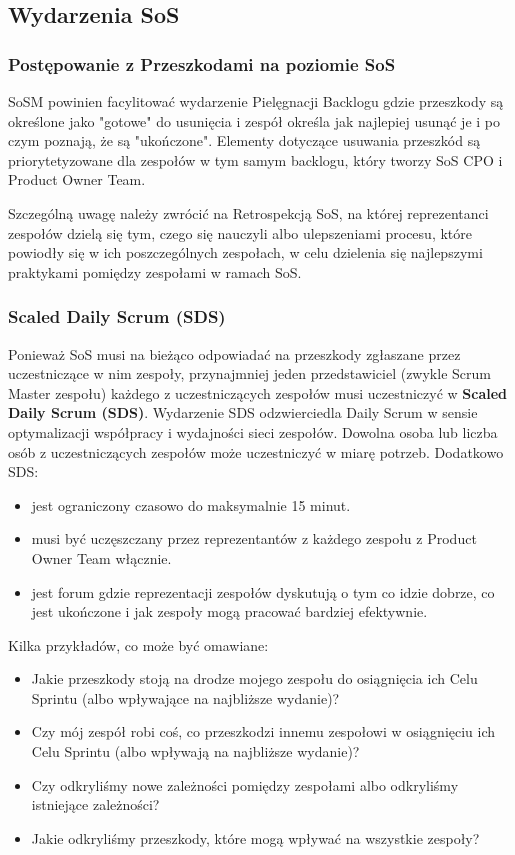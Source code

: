 \documentclass[12pt,a4paper,parskip=full]{scrartcl}
\begin{document}
\subsection{Wydarzenia SoS}

\subsubsection{Postępowanie z Przeszkodami na poziomie SoS}

SoSM powinien facylitować wydarzenie Pielęgnacji Backlogu gdzie przeszkody są określone jako "gotowe" do usunięcia i zespół określa jak najlepiej usunąć je i po czym poznają, że są "ukończone". Elementy dotyczące usuwania przeszkód są priorytetyzowane dla zespołów w tym samym backlogu, który tworzy SoS CPO i Product Owner Team.

Szczególną uwagę należy zwrócić na Retrospekcją SoS, na której reprezentanci zespołów dzielą się tym, czego się nauczyli albo ulepszeniami procesu, które powiodły się w ich poszczególnych zespołach, w celu dzielenia się najlepszymi praktykami pomiędzy zespołami w ramach SoS.  %

\subsubsection{Scaled Daily Scrum (SDS)}

Ponieważ SoS musi na bieżąco odpowiadać na przeszkody zgłaszane przez uczestniczące w nim zespoły, przynajmniej jeden przedstawiciel (zwykle Scrum Master zespołu) każdego z uczestniczących zespołów musi uczestniczyć w \textbf{Scaled Daily Scrum (SDS)}. Wydarzenie SDS odzwierciedla Daily Scrum w sensie optymalizacji współpracy i wydajności sieci zespołów. Dowolna osoba lub liczba osób z uczestniczących zespołów może uczestniczyć w miarę potrzeb. Dodatkowo SDS:

\begin{itemize}
	\item jest ograniczony czasowo do maksymalnie 15 minut.
	\item musi być uczęszczany przez reprezentantów z każdego zespołu z Product Owner Team włącznie.
	\item jest forum gdzie reprezentacji zespołów dyskutują o tym co idzie dobrze, co jest ukończone i jak zespoły mogą pracować bardziej efektywnie. 
\end{itemize}
	
Kilka przykładów, co może być omawiane:
\begin{itemize}
	\item Jakie przeszkody stoją na drodze mojego zespołu do osiągnięcia ich Celu Sprintu (albo wpływające na najbliższe wydanie)?
	\item Czy mój zespół robi coś, co przeszkodzi innemu zespołowi w osiągnięciu ich Celu Sprintu (albo wpływają na najbliższe wydanie)?
	\item Czy odkryliśmy nowe zależności pomiędzy zespołami albo odkryliśmy istniejące zależności?
	\item Jakie odkryliśmy przeszkody, które mogą wpływać na wszystkie zespoły?
\end{itemize}
\end{document}
